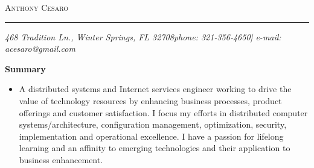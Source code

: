 \documentclass[10pt,oneside]{article}
\makeatletter
\newcommand{\name}{Anthony Cesaro}
\newcommand{\email}{acesaro@gmail.com}
\newcommand{\addr}{468 Tradition Ln., Winter Springs, FL 32708}
\newcommand{\phone}{321-356-4650}
\newcommand{\bigname}[1]{
	\begin{flushleft}\selectfont\Large\scshape#1\end{flushleft}
}
\newenvironment{ressection}[1]{
	\vspace{4pt}
	\textbf{\selectfont\normalsize#1}
	\begin{itemize}
	\vspace{3pt}
}{
	\end{itemize}
}
\newcommand{\resitem}[1]{
	\vspace{-4pt}
	\item \begin{flushleft} #1 \end{flushleft}
}
\makeatother
\begin{document}
 \selectfont

\bigname{\name}

\vspace{-8pt} \rule{\textwidth}{1pt}

\vspace{-1pt} {\small\itshape \addr \hfill phone: \phone | e-mail: \email}

\vspace{8 pt}


\begin{ressection}{Summary}

	\resitem{A distributed systems and Internet services engineer working to drive the value of technology resources by enhancing business processes, product offerings and customer satisfaction.  I focus my efforts in distributed computer systems/architecture, configuration management, optimization, security, implementation and operational excellence.  I have a passion for lifelong learning and an affinity to emerging technologies and their application to business enhancement.}

\end{ressection}

\end{document}
